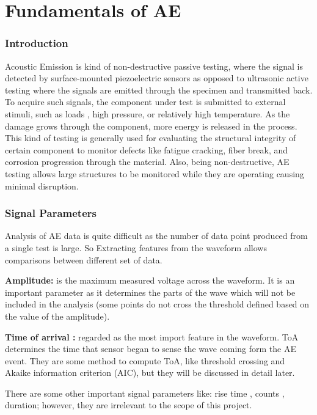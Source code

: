 
\large
\part{Fundamentals of AE}


\section{Introduction}

Acoustic Emission is kind of non-destructive passive testing, where the
signal is detected by surface-mounted piezoelectric sensors as opposed
to ultrasonic active testing where the signals are emitted through the
specimen and transmitted back. To acquire such signals, the component
under test is submitted to external stimuli, such as loads , high
pressure, or relatively high temperature. As the damage grows through
the component, more energy is released in the process. This kind of
testing is generally used for evaluating the structural integrity of
certain component to monitor defects like fatigue cracking, fiber break,
and corrosion progression through the material. Also, being
non-destructive, AE testing allows large structures to be monitored
while they are operating causing minimal disruption.

\section{Signal Parameters}

Analysis of AE data is quite difficult as the number of data point
produced from a single test is large. So Extracting features from the
waveform allows comparisons between different set of data.

\textbf{Amplitude:} is the maximum measured voltage across the
waveform. It is an important parameter as it determines the parts of the
wave which will not be included in the analysis (some points do not
cross the threshold defined based on the value of the amplitude).

\textbf{Time of arrival :} regarded as the most import feature in the
waveform. ToA determines the time that sensor began to sense the wave
coming form the AE event. They are some method to compute ToA, like
threshold crossing and Akaike information criterion (AIC), but they will
be discussed in detail later.

There are some other important signal parameters like: rise time ,
counts , duration; however, they are irrelevant to the scope of this
project.

